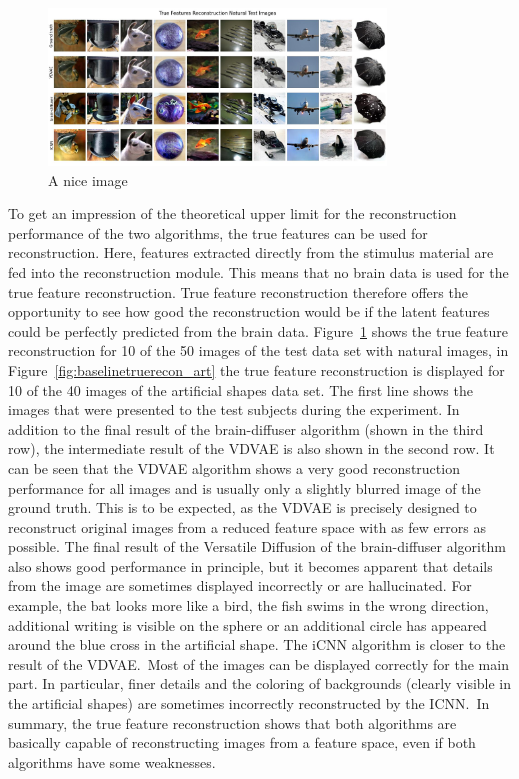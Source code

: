 \begin{figure}[ht]
    \centering
    \includegraphics[width=0.8\textwidth]{plots/baseline_qual_true_recon_test.JPEG}
    \caption{A nice image}\label{fig:baselinetruerecon}
\end{figure}
To get an impression of the theoretical upper limit for the reconstruction performance of the two algorithms, the true features can be used for reconstruction. Here, features extracted directly from the stimulus material are fed into the reconstruction module. This means that no brain data is used for the true feature reconstruction. True feature reconstruction therefore offers the opportunity to see how good the reconstruction would be if the latent features could be perfectly predicted from the brain data. Figure~\ref{fig:baselinetruerecon} shows the true feature reconstruction for 10 of the 50 images of the test data set with natural images, in Figure~\ref{fig:baselinetruerecon_art} the true feature reconstruction is displayed for 10 of the 40 images of the artificial shapes data set. The first line shows the images that were presented to the test subjects during the experiment. In addition to the final result of the brain-diffuser algorithm (shown in the third row), the intermediate result of the VDVAE is also shown in the second row. It can be seen that the VDVAE algorithm shows a very good reconstruction performance for all images and is usually only a slightly blurred image of the ground truth. This is to be expected, as the VDVAE is precisely designed to reconstruct original images from a reduced feature space with as few errors as possible. The final result of the Versatile Diffusion of the brain-diffuser algorithm also shows good performance in principle, but it becomes apparent that details from the image are sometimes displayed incorrectly or are hallucinated. For example, the bat looks more like a bird, the fish swims in the wrong direction, additional writing is visible on the sphere or an additional circle has appeared around the blue cross in the artificial shape. The iCNN algorithm is closer to the result of the VDVAE.\ Most of the images can be displayed correctly for the main part. In particular, finer details and the coloring of backgrounds (clearly visible in the artificial shapes) are sometimes incorrectly reconstructed by the ICNN.\ In summary, the true feature reconstruction shows that both algorithms are basically capable of reconstructing images from a feature space, even if both algorithms have some weaknesses.


